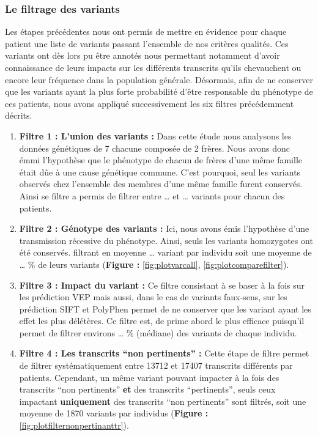\documentclass[12pt,twoside]{reedthesis}
\theoremstyle{definition}
\theoremstyle{definition}
\theoremstyle{remark}
\begin{document}
  \subsubsection{Le filtrage des
  variants}\label{le-filtrage-des-variants-1}
  
  Les étapes précédentes nous ont permis de mettre en évidence pour chaque
  patient une liste de variants passant l'ensemble de nos critères
  qualités. Ces variants ont dès lors pu être annotés nous permettant
  notamment d'avoir connaissance de leurs impacts sur les différents
  transcrits qu'ils chevauchent ou encore leur fréquence dans la
  population générale. Désormais, afin de ne conserver que les variants
  ayant la plus forte probabilité d'être responsable du phénotype de ces
  patients, nous avons appliqué successivement les six filtres
  précédemment décrits.
  
  \begin{enumerate}
  \def\labelenumi{\arabic{enumi}.}
  \item
    \textbf{Filtre 1 : L'union des variants :} Dans cette étude nous
    analysons les données génétiques de 7 chacune composée de 2 frères.
    Nous avons donc émmi l'hypothèse que le phénotype de chacun de frères
    d'une même famille était dûe à une cause génétique commune. C'est
    pourquoi, seul les variants observés chez l'ensemble des membres d'une
    même famille furent conservés. Ainsi se filtre a permis de filtrer
    entre \ldots{} et \ldots{} variants pour chacun des patients.
  \item
    \textbf{Filtre 2 : Génotype des variants :} Ici, nous avons émis
    l'hypothèse d'une transmission récessive du phénotype. Ainsi, seuls
    les variants homozygotes ont été conservés. filtrant en moyenne
    \ldots{} variant par individu soit une moyenne de \ldots{} \% de leurs
    variants (\textbf{Figure : }\ref{fig:plotvarcall},
    \ref{fig:plotcomparefilter}).
  \item
    \textbf{Filtre 3 : Impact du variant :} Ce filtre consistant à se
    baser à la fois sur les prédiction VEP mais aussi, dans le cas de
    variants faux-sens, sur les prédiction SIFT et PolyPhen permet de ne
    conserver que les variant ayant les effet les plus délétères. Ce
    filtre est, de prime abord le plus efficace puisqu'il permet de
    filtrer environs \ldots{} \% (médiane) des variants de chaque
    individu.
  \item
    \textbf{Filtre 4 : Les transcrits ``non pertinents'' :} Cette étape de
    filtre permet de filtrer systématiquement entre 13712 et 17407
    transcrits différents par patients. Cependant, un même variant pouvant
    impacter à la fois des transcrits ``non pertinents'' \textbf{et} des
    transcrits ``pertinents'', seuls ceux impactant \textbf{uniquement}
    des transcrits ``non pertinents'' sont filtrés, soit une moyenne de
    1870 variants par individus (\textbf{Figure :
    }\ref{fig:plotfilternonpertinanttr}).
  \end{enumerate}
  
\end{document}
